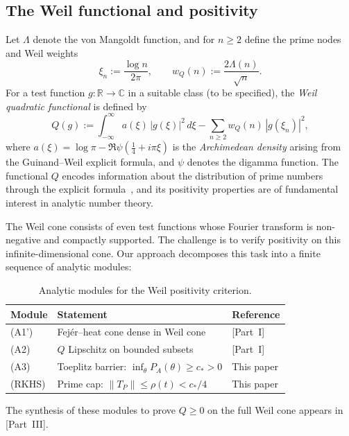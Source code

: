 \documentclass[11pt,a4paper]{article}
\theoremstyle{definition}
\theoremstyle{remark}
\newcommand{\R}{\mathbb{R}}
\newcommand{\C}{\mathbb{C}}
\begin{document}
\subsection{The Weil functional and positivity}

Let $\Lambda$ denote the von Mangoldt function, and for $n \geq 2$ define the prime nodes and Weil weights
\begin{equation}\label{eq:nodes-weights}
  \xi_n := \frac{\log n}{2\pi}, \qquad w_Q(n) := \frac{2\Lambda(n)}{\sqrt{n}}.
\end{equation}
For a test function $g : \R \to \C$ in a suitable class (to be specified), the \emph{Weil quadratic functional} is defined by
\begin{equation}\label{eq:Q-def}
  Q(g) := \int_{-\infty}^{\infty} a(\xi)\, |g(\xi)|^2\, d\xi
         - \sum_{n \geq 2} w_Q(n)\, |g(\xi_n)|^2,
\end{equation}
where $a(\xi) = \log \pi - \Re \psi(\tfrac{1}{4} + i\pi\xi)$ is the \emph{Archimedean density} arising from the Guinand--Weil explicit formula, and $\psi$ denotes the digamma function. The functional $Q$ encodes information about the distribution of prime numbers through the explicit formula~\cite{Weil1952}, and its positivity properties are of fundamental interest in analytic number theory.

The Weil cone consists of even test functions whose Fourier transform is non-negative and compactly supported. The challenge is to verify positivity on this infinite-dimensional cone. Our approach decomposes this task into a finite sequence of analytic modules:

\begin{table}[h]
\centering
\caption{Analytic modules for the Weil positivity criterion.}
\label{tab:modules}
\begin{tabular}{@{}lll@{}}
\toprule
Module & Statement & Reference \\
\midrule
(A1') & Fej\'er--heat cone dense in Weil cone & [Part~I] \\
(A2)  & $Q$ Lipschitz on bounded subsets & [Part~I] \\
(A3)  & Toeplitz barrier: $\inf_\theta P_A(\theta) \geq c_* > 0$ & This paper \\
(RKHS) & Prime cap: $\|T_P\| \leq \rho(t) < c_*/4$ & This paper \\
\bottomrule
\end{tabular}
\end{table}

\noindent The synthesis of these modules to prove $Q \geq 0$ on the full Weil cone appears in [Part~III].
\end{document}
